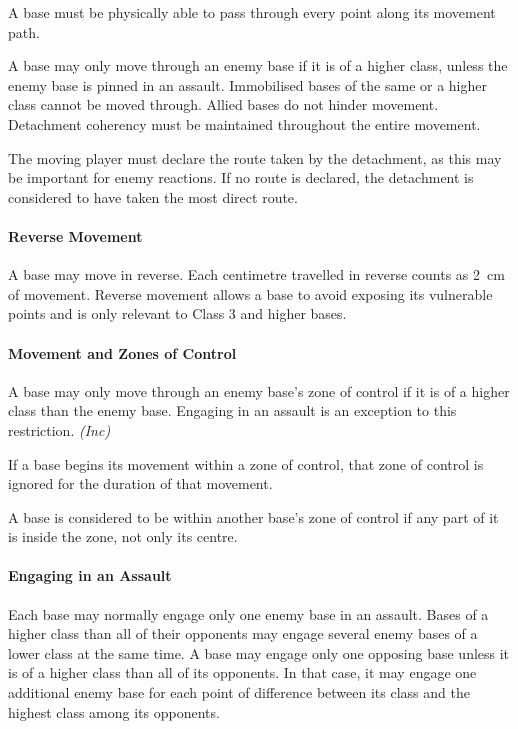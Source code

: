 A base must be physically able to pass through every point along its movement path.

A base may only move through an enemy base if it is of a higher class, unless the enemy base is pinned in an assault. Immobilised bases of the same or a higher class cannot be moved through. Allied bases do not hinder movement. Detachment coherency must be maintained throughout the entire movement.

The moving player must declare the route taken by the detachment, as this may be important for enemy reactions. If no route is declared, the detachment is considered to have taken the most direct route.

\paragraph{Reverse Movement}

A base may move in reverse. Each centimetre travelled in reverse counts as 2~cm of movement. Reverse movement allows a base to avoid exposing its vulnerable points and is only relevant to Class 3 and higher bases.

\paragraph{Movement and Zones of Control}

A base may only move through an enemy base's zone of control if it is of a higher class than the enemy base. Engaging in an assault is an exception to this restriction. \textit{(Inc)}

If a base begins its movement within a zone of control, that zone of control is ignored for the duration of that movement.

A base is considered to be within another base's zone of control if any part of it is inside the zone, not only its centre.

\paragraph{Engaging in an Assault}

Each base may normally engage only one enemy base in an assault. Bases of a higher class than all of their opponents may engage several enemy bases of a lower class at the same time. A base may engage only one opposing base unless it is of a higher class than all of its opponents. In that case, it may engage one additional enemy base for each point of difference between its class and the highest class among its opponents.

